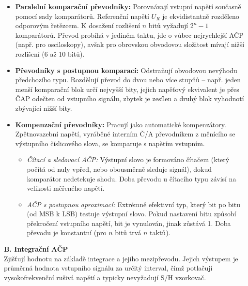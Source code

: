         \begin{itemize}
            \item \textbf{Paralelní komparační převodníky:} Porovnávají vstupní napětí současně pomocí sady komparátorů. Referenční napětí $U_R$ je ekvidistantně rozděleno odporovým řetězcem. K dosažení rozlišení $n$ bitů vyžadují $2^n - 1$ komparátorů. Převod probíhá v jediném taktu, jde o vůbec nejrychlejší AČP (např. pro osciloskopy), avšak pro obrovskou obvodovou složitost mívají nižší rozlišení (6 až 10 bitů).
            \item \textbf{Převodníky s postupnou komparací:} Odstraňují obvodovou nevýhodu předchozího typu. Rozdělují převod do dvou nebo více stupňů – např. jeden menší komparační blok určí nejvyšší bity, jejich napěťový ekvivalent je přes ČAP odečten od vstupního signálu, zbytek je zesílen a druhý blok vyhodnotí zbývající nižší bity.
            \item \textbf{Kompenzační převodníky:} Pracují jako automatické kompenzátory. Zpětnovazební napětí, vyráběné interním Č/A převodníkem z měnícího se výstupního číslicového slova, se komparuje s napětím vstupním.
            \begin{itemize}
                \item \textit{Čítací a sledovací AČP:} Výstupní slovo je formováno čítačem (který počítá od nuly vpřed, nebo obousměrně sleduje signál), dokud komparátor nedetekuje shodu. Doba převodu u čítacího typu závisí na velikosti měřeného napětí.
                \item \textit{AČP s postupnou aproximací:} Extrémně efektivní typ, který bit po bitu (od MSB k LSB) testuje výstupní slovo. Pokud nastavení bitu způsobí překročení vstupního napětí, bit je vynulován, jinak zůstává 1. Doba převodu je konstantní (pro $n$ bitů trvá $n$ taktů).
            \end{itemize}
        \end{itemize}
        
        \textbf{B. Integrační AČP}\\
        Zjišťují hodnotu na základě integrace a jejího mezipřevodu. Jejich výstupem je průměrná hodnota vstupního signálu za určitý interval, čímž potlačují vysokofrekvenční rušivá napětí a typicky nevyžadují S/H vzorkovač.
        
